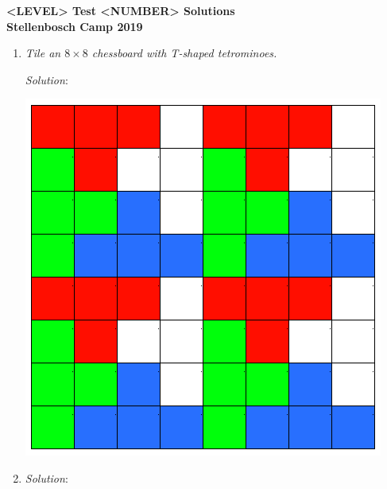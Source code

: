 \documentclass{article}
\begin{document}
\begin{center}
  \textbf{\Large <LEVEL> Test <NUMBER> Solutions}
  \\ \vspace{1em}
  \textbf{\large Stellenbosch Camp 2019}
\end{center}


\begin{enumerate}[1.]

\item %
\textit
{
    Tile an $8 \times 8$ chessboard with T-shaped tetrominoes.
}

\textit{Solution}: 
\begin{center}
    \includegraphics[scale=0.5]{tiling.png}
\end{center}

\item %
\textit{}

\textit{Solution}:


\end{enumerate}
\end{document}

